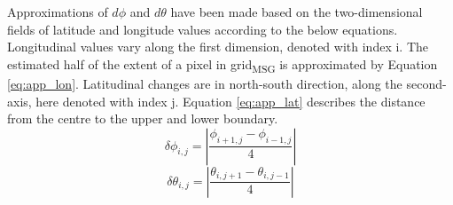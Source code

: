 Approximations of $d\phi$ and $d\theta$ have been made based on the two-dimensional fields of latitude and longitude values according to the below equations.
Longitudinal values vary along the first dimension, denoted with index i. The estimated half of the extent of a pixel in grid\textsubscript{MSG} is approximated by Equation \eqref{eq:app_lon}. Latitudinal changes are in north-south direction, along the second-axis, here denoted with index j. Equation \eqref{eq:app_lat} describes the distance from the centre to the upper and lower boundary.
\begin{equation} \label{eq:app_lon}
    \delta \phi_{i,j} = \left| \frac{\phi_{i+1,j} - \phi_{i-1, j}}{4} \right|
\end{equation}
\begin{equation} \label{eq:app_lat}
    \delta \theta_{i,j} = \left| \frac{\theta_{i,j+1} - \theta_{i, j-1}}{4} \right|
\end{equation}

